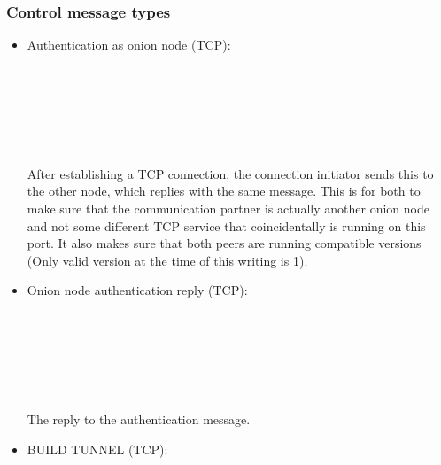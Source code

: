 \documentclass{article}
\begin{document}
\subsubsection{Control message types}
\begin{itemize}
	\item Authentication as onion node (TCP):
	
\begin{bytefield}[bitwidth=1.0em]{32}
	 \\
	 \\
	 \\
	 \\
	\skippedwords \\
\end{bytefield}
	
	After establishing a TCP connection, the connection initiator sends this to the other node, which replies with the same message. This is for both to make sure that the communication partner is actually another onion node and not some different TCP service that coincidentally is running on this port. It also makes sure that both peers are running compatible versions (Only valid version at the time of this writing is 1).
	
	\item Onion node authentication reply (TCP):\\
	
\begin{bytefield}[bitwidth=1.0em]{32}
	 \\
	 \\
	 \\
	 \\
	\skippedwords \\
\end{bytefield}
	The reply to the authentication message.
	
	\item BUILD TUNNEL (TCP): \\
	

\end{itemize}
\end{document}
